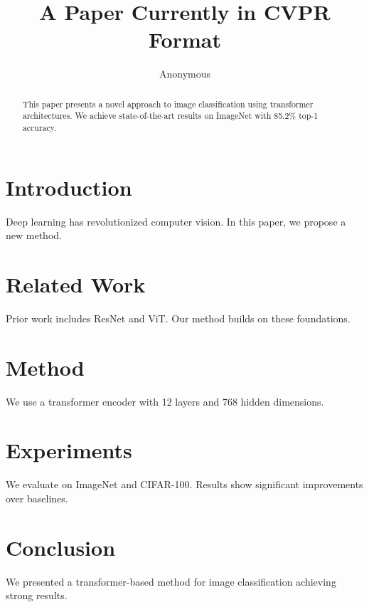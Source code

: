 \documentclass{article}
\title{A Paper Currently in CVPR Format}
\author{Anonymous}
\begin{document}
\maketitle

\begin{abstract}
This paper presents a novel approach to image classification using transformer architectures.
We achieve state-of-the-art results on ImageNet with 85.2\% top-1 accuracy.
\end{abstract}

\section{Introduction}
Deep learning has revolutionized computer vision. In this paper, we propose a new method.

\section{Related Work}
Prior work includes ResNet and ViT. Our method builds on these foundations.

\section{Method}
We use a transformer encoder with 12 layers and 768 hidden dimensions.

\section{Experiments}
We evaluate on ImageNet and CIFAR-100. Results show significant improvements over baselines.

\section{Conclusion}
We presented a transformer-based method for image classification achieving strong results.



\end{document}
